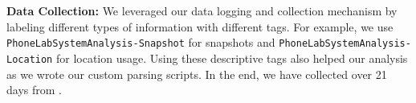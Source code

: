 {\bf Data Collection:} We leveraged our data logging and collection mechanism by
labeling different types of information with different tags. For example,
we use \texttt{PhoneLabSystemAnalysis-Snapshot} for snapshots and
\texttt{PhoneLabSystemAnalysis-Location} for location usage. Using these
descriptive tags also helped our analysis as we wrote our custom parsing
scripts. In the end, we have collected  over 21 days from .

%
%
%
%
%

